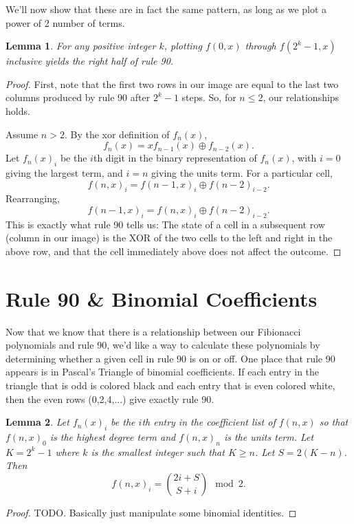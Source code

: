 \documentclass[a4paper]{article}
\newtheorem{lemma}{Lemma}
\newcommand{\xor}{\oplus}
\begin{document}
	We'll now show that these are in fact the same pattern, as long as we plot a power of 2 number of terms.
	\begin{lemma}
		For any positive integer $k$, plotting $f(0,x)$ through $f(2^k - 1,x)$ inclusive yields the right half of rule 90. 
	\end{lemma}
	\begin{proof}
		First, note that the first two rows in our image are equal to the last two columns produced by rule 90 after $2^k - 1$ steps.
		So, for $n \leq 2$, our relationships holds.
		
		Assume $n > 2$.
		By the xor definition of $f_n(x)$,
		\begin{equation*}
			f_n(x) = xf_{n-1}(x) \xor f_{n-2}(x).
		\end{equation*}
		Let $f_n(x)_i$ be the $i$th digit in the binary representation of $f_n(x)$, with $i=0$ giving the largest term, and $i=n$ giving the units term.
		For a particular cell,
		\begin{equation*}
			f(n,x)_i = f(n-1,x)_i \xor f(n-2)_{i-2}.
		\end{equation*}
		Rearranging,
		\begin{equation*}
			f(n-1,x)_i = f(n,x)_i \xor f(n-2)_{i-2}.
		\end{equation*}
		This is exactly what rule 90 tells us: The state of a cell in a subsequent row (column in our image) is the XOR of the two cells to the left and right in the above row, and that the cell immediately above does not affect the outcome.
	\end{proof}
	
	\section{Rule 90 \& Binomial Coefficients}
	Now that we know that there is a relationship between our Fibionacci polynomials and rule 90, we'd like a way to calculate these polynomials by determining whether a given cell in rule 90 is on or off.
	One place that rule 90 appears is in Pascal's Triangle of binomial coefficients.
	If each entry in the triangle that is odd is colored black and each entry that is even colored white, then the even rows (0,2,4,...) give exactly rule 90.
	
	\begin{lemma}
		Let $f_n(x)_i$ be the $i$th entry in the coefficient list of $f(n,x)$ so that $f(n,x)_0$ is the highest degree term and $f(n,x)_n$ is the units term.
		Let $K = 2^k - 1$ where $k$ is the smallest integer such that $K \geq n$.
		Let $S = 2(K-n)$.
		Then
		\begin{equation*}
			f(n,x)_i = \binom{2i + S}{S + i} \mod 2.
		\end{equation*}	
	\end{lemma}
	\begin{proof}
		TODO. Basically just manipulate some binomial identities.
	\end{proof}
\end{document}
